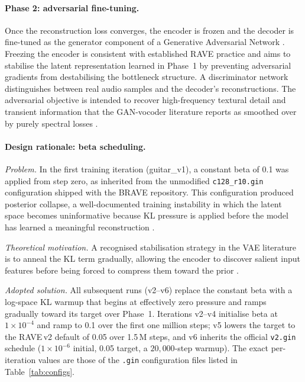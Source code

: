 \documentclass[a4paper,11pt,oneside,openany]{book}
\begin{document}
\paragraph{Phase 2: adversarial fine-tuning.} Once the reconstruction loss converges, the encoder is frozen and the decoder is fine-tuned as the generator component of a Generative Adversarial Network \parencite{goodfellow2014gan}. Freezing the encoder is consistent with established RAVE practice \parencite{caillon2021rave} and aims to stabilise the latent representation learned in Phase~1 by preventing adversarial gradients from destabilising the bottleneck structure. A discriminator network distinguishes between real audio samples and the decoder's reconstructions. The adversarial objective is intended to recover high-frequency textural detail and transient information that the GAN-vocoder literature reports as smoothed over by purely spectral losses \parencite{kong2020hifigan}.

\paragraph{Design rationale: beta scheduling.}
\textit{Problem.} In the first training iteration (guitar\_v1), a constant beta of 0.1 was applied from step zero, as inherited from the unmodified \texttt{c128\_r10.gin} configuration shipped with the BRAVE repository. This configuration produced posterior collapse, a well-documented training instability in which the latent space becomes uninformative because KL pressure is applied before the model has learned a meaningful reconstruction \parencite{bowman2016vaeannealing}.

\textit{Theoretical motivation.} A recognised stabilisation strategy in the VAE literature is to anneal the KL term gradually, allowing the encoder to discover salient input features before being forced to compress them toward the prior \parencite{bowman2016vaeannealing}.

\textit{Adopted solution.} All subsequent runs (v2--v6) replace the constant beta with a log-space KL warmup that begins at effectively zero pressure and ramps gradually toward its target over Phase~1. Iterations v2--v4 initialise beta at $1\times10^{-4}$ and ramp to 0.1 over the first one million steps; v5 lowers the target to the RAVE\,v2 default of 0.05 over 1.5\,M steps, and v6 inherits the official \texttt{v2.gin} schedule ($1\times10^{-6}$ initial, 0.05 target, a $20{,}000$-step warmup). The exact per-iteration values are those of the \texttt{.gin} configuration files listed in Table~\ref{tab:configs}.
\end{document}
